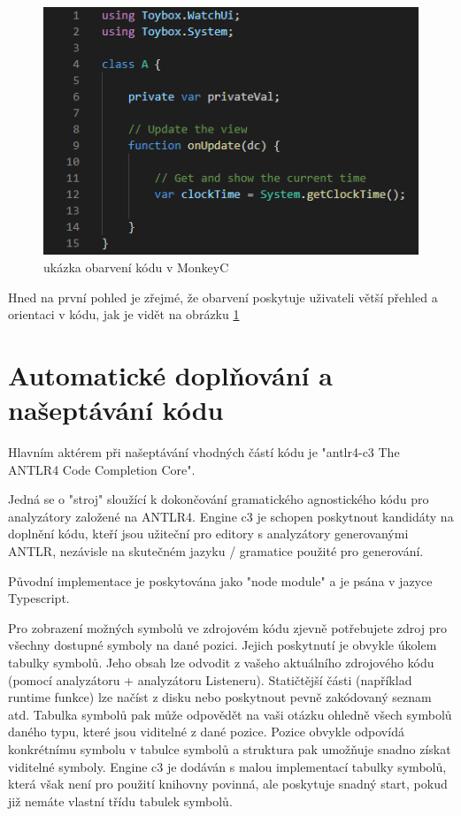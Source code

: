 \begin{figure}
	\centering
	\includegraphics[]{images/colored_code}
	\caption{ukázka obarvení kódu v MonkeyC} 
	\label{img:colored_code}
\end{figure}
	
Hned na první pohled je zřejmé, že obarvení poskytuje uživateli větší přehled a orientaci v kódu, jak je vidět na obrázku \ref{img:colored_code}


\section{Automatické doplňování a našeptávání kódu}

Hlavním aktérem při našeptávání vhodných částí kódu je "antlr4-c3 The ANTLR4 Code Completion Core".

Jedná se o "stroj" sloužící k dokončování gramatického agnostického kódu pro analyzátory založené na ANTLR4. Engine c3 je schopen poskytnout kandidáty na doplnění kódu, kteří jsou užiteční pro editory s analyzátory generovanými ANTLR, nezávisle na skutečném jazyku / gramatice použité pro generování.

Původní implementace je poskytována jako "node module" a je psána v jazyce Typescript.

Pro zobrazení možných symbolů ve zdrojovém kódu zjevně potřebujete zdroj pro všechny dostupné symboly na dané pozici. Jejich poskytnutí je obvykle úkolem tabulky symbolů. Jeho obsah lze odvodit z vašeho aktuálního zdrojového kódu (pomocí analyzátoru + analyzátoru Listeneru). Statičtější části (například runtime funkce) lze načíst z disku nebo poskytnout pevně zakódovaný seznam atd. Tabulka symbolů pak může odpovědět na vaši otázku ohledně všech symbolů daného typu, které jsou viditelné z dané pozice. Pozice obvykle odpovídá konkrétnímu symbolu v tabulce symbolů a struktura pak umožňuje snadno získat viditelné symboly. Engine c3 je dodáván s malou implementací tabulky symbolů, která však není pro použití knihovny povinná, ale poskytuje snadný start, pokud již nemáte vlastní třídu tabulek symbolů.

